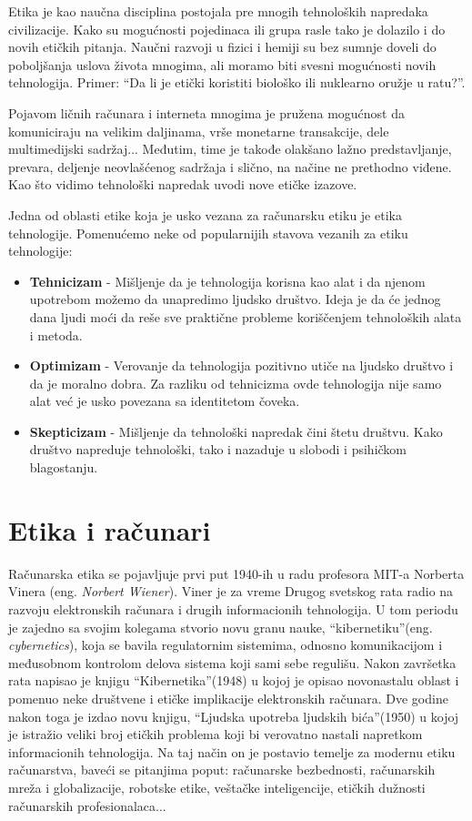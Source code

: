 \documentclass[a4paper]{article}
\begin{document}
Etika je kao naučna disciplina postojala pre mnogih tehnoloških napredaka civilizacije. Kako su mogućnosti pojedinaca ili grupa rasle tako je dolazilo i do novih etičkih pitanja. Naučni razvoji u fizici i hemiji su bez sumnje doveli do poboljšanja uslova života mnogima, ali moramo biti svesni mogućnosti novih tehnologija. Primer: ``Da li je etički koristiti biološko ili nuklearno oružje u ratu?''.

Pojavom ličnih računara i interneta mnogima je pružena mogućnost da komuniciraju na velikim daljinama, vrše monetarne transakcije, dele multimedijski sadržaj... Međutim, time je takođe olakšano lažno predstavljanje, prevara, deljenje neovlašćenog sadržaja i slično, na načine ne prethodno viđene.
Kao što vidimo tehnološki napredak uvodi nove etičke izazove.

Jedna od oblasti etike koja je usko vezana za računarsku etiku je etika tehnologije. Pomenućemo neke od popularnijih stavova vezanih za etiku tehnologije:
\begin{itemize}
	\item \textbf{Tehnicizam} -
	Mišljenje da je tehnologija korisna kao alat i da njenom upotrebom možemo da unapredimo ljudsko društvo. Ideja je da će jednog dana ljudi moći da reše sve praktične probleme koriščenjem tehnoloških alata i metoda.
	\item \textbf{Optimizam} - Verovanje da tehnologija pozitivno utiče na ljudsko društvo i da je moralno dobra. Za razliku od tehnicizma ovde tehnologija nije samo alat već je usko povezana sa identitetom čoveka.
	\item \textbf{Skepticizam} - Mišljenje da tehnološki napredak čini štetu društvu. Kako društvo napreduje tehnološki, tako i nazaduje u slobodi i psihičkom blagostanju.
\end{itemize}


\section{Etika i računari}

Računarska etika se pojavljuje prvi put 1940-ih u radu profesora MIT-a
Norberta Vinera (eng. \textit{Norbert Wiener})\cite{bynum}. Viner je za vreme Drugog svetskog rata radio na razvoju elektronskih računara i drugih informacionih tehnologija. U tom periodu je zajedno sa svojim kolegama stvorio novu granu nauke, ``kibernetiku''(eng. \textit{cybernetics}), koja se bavila regulatornim sistemima, odnosno komunikacijom i međusobnom kontrolom delova sistema koji sami sebe regulišu.
Nakon završetka rata napisao je knjigu ``Kibernetika''(1948) u kojoj je opisao novonastalu oblast i pomenuo neke društvene i etičke implikacije elektronskih računara. Dve godine nakon toga je izdao novu knjigu, ``Ljudska upotreba ljudskih bića''(1950) u kojoj je istražio veliki broj etičkih problema koji bi verovatno nastali napretkom informacionih tehnologija. Na taj način on je postavio temelje za modernu etiku računarstva, baveći se pitanjima poput: računarske bezbednosti, računarskih mreža i globalizacije, robotske etike, veštačke inteligencije, etičkih dužnosti računarskih profesionalaca...
\end{document}
